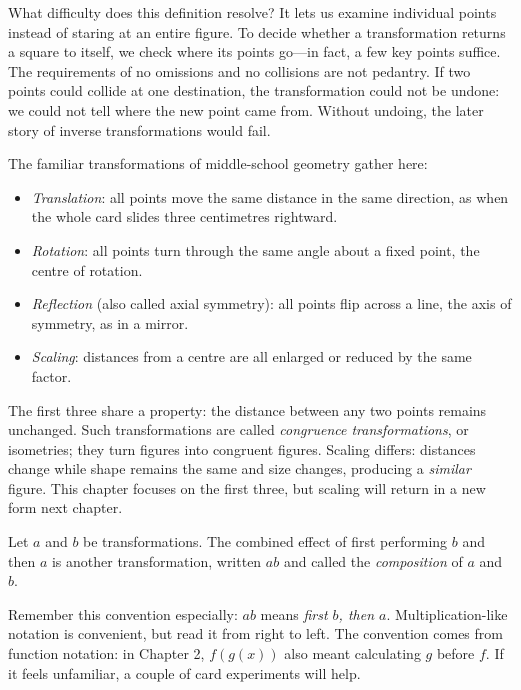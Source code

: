 What difficulty does this definition resolve? It lets us examine individual points instead of staring at an entire figure. To decide whether a transformation returns a square to itself, we check where its points go---in fact, a few key points suffice. The requirements of no omissions and no collisions are not pedantry. If two points could collide at one destination, the transformation could not be undone: we could not tell where the new point came from. Without undoing, the later story of inverse transformations would fail.

The familiar transformations of middle-school geometry gather here:

\begin{itemize}
  \item \emph{Translation}: all points move the same distance in the same direction, as when the whole card slides three centimetres rightward.
  \item \emph{Rotation}: all points turn through the same angle about a fixed point, the centre of rotation.
  \item \emph{Reflection} (also called axial symmetry): all points flip across a line, the axis of symmetry, as in a mirror.
  \item \emph{Scaling}: distances from a centre are all enlarged or reduced by the same factor.
\end{itemize}

The first three share a property: the distance between any two points remains unchanged. Such transformations are called \emph{congruence transformations}, or isometries; they turn figures into congruent figures. Scaling differs: distances change while shape remains the same and size changes, producing a \emph{similar} figure. This chapter focuses on the first three, but scaling will return in a new form next chapter.

\begin{dingyi}[Composition]
Let $a$ and $b$ be transformations. The combined effect of first performing $b$ and then $a$ is another transformation, written $ab$ and called the \emph{composition} of $a$ and $b$.
\end{dingyi}

Remember this convention especially: $ab$ means \emph{first $b$, then $a$}. Multiplication-like notation is convenient, but read it from right to left. The convention comes from function notation: in Chapter 2, $f(g(x))$ also meant calculating $g$ before $f$. If it feels unfamiliar, a couple of card experiments will help.

